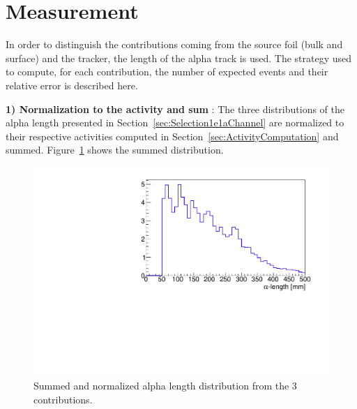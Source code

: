\documentclass[main.tex]{subfiles}
\begin{document}

\section{Measurement}\label{sec:MeasurementStategy}

\noindent In order to distinguish the contributions coming from the source foil (bulk and surface) and the tracker, the length of the alpha track is used. The strategy used to compute, for each contribution, the number of expected events and their relative error is described here.


\bigskip


\noindent \textbf{1) Normalization to the activity and sum} : The three distributions of the alpha length presented in Section~\ref{sec:Selection1e1aChannel} are normalized to their respective activities computed in Section~\ref{sec:ActivityComputation} and summed. Figure~\ref{ref_distribution} shows the summed distribution.


\begin{figure}[h!]
\begin{center}
\includegraphics[scale=0.6]{pictures/Chap5/basic_distribution_alpha_length.pdf}
\caption{Summed and normalized alpha length distribution from the 3 contributions.}
\label{ref_distribution}
\end{center}
\end{figure}


\bigskip
\end{document}
